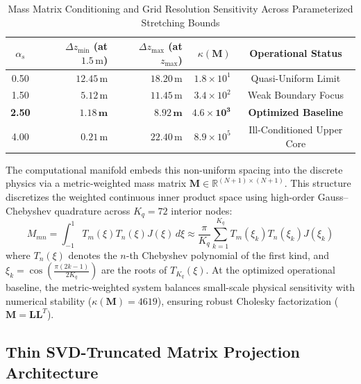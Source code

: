 \begin{table}[h]
\centering
\caption{Mass Matrix Conditioning and Grid Resolution Sensitivity Across Parameterized Stretching Bounds}
\label{tab:stretch_sensitivity}
\vspace{0.2cm}
\begin{tabular}{c|rrrc}
\hline
$\alpha_s$ & $\Delta z_{\min}$ (at $1.5\,\text{m}$) & $\Delta z_{\max}$ (at $z_{\max}$) & $\kappa(\mathbf{M})$ & Operational Status \\
\hline
0.50 & $12.45\,\text{m}$ & $18.20\,\text{m}$ & $1.8 \times 10^1$ & Quasi-Uniform Limit \\
1.50 & $5.12\,\text{m}$  & $11.45\,\text{m}$ & $3.4 \times 10^2$ & Weak Boundary Focus \\
\textbf{2.50} & $\mathbf{1.18\,\text{m}}$  & $\mathbf{8.92\,\text{m}}$  & $\mathbf{4.6 \times 10^3}$ & \textbf{Optimized Baseline} \\
4.00 & $0.21\,\text{m}$  & $22.40\,\text{m}$ & $8.9 \times 10^5$ & Ill-Conditioned Upper Core \\
\hline
\end{tabular}
\end{table}

The computational manifold embeds this non-uniform spacing into the discrete physics via a metric-weighted mass matrix $\mathbf{M} \in \mathbb{R}^{(N+1) \times (N+1)}$. This structure discretizes the weighted continuous inner product space using high-order Gauss--Chebyshev quadrature across $K_q = 72$ interior nodes:
\begin{equation}
M_{mn} = \int_{-1}^{1} T_m(\xi) T_n(\xi) J(\xi) \, d\xi \approx \frac{\pi}{K_q} \sum_{k=1}^{K_q} T_m(\xi_k) T_n(\xi_k) J(\xi_k)
\label{eq:mass_matrix_quad}
\end{equation}
where $T_n(\xi)$ denotes the $n$-th Chebyshev polynomial of the first kind, and $\xi_k = \cos\left(\frac{\pi(2k-1)}{2K_q}\right)$ are the roots of $T_{K_q}(\xi)$. At the optimized operational baseline, the metric-weighted system balances small-scale physical sensitivity with numerical stability ($\kappa(\mathbf{M}) = 4619$), ensuring robust Cholesky factorization ($\mathbf{M} = \mathbf{L}\mathbf{L}^T$).



\subsection{Thin SVD-Truncated Matrix Projection Architecture}
\label{sec:methods:svd}

